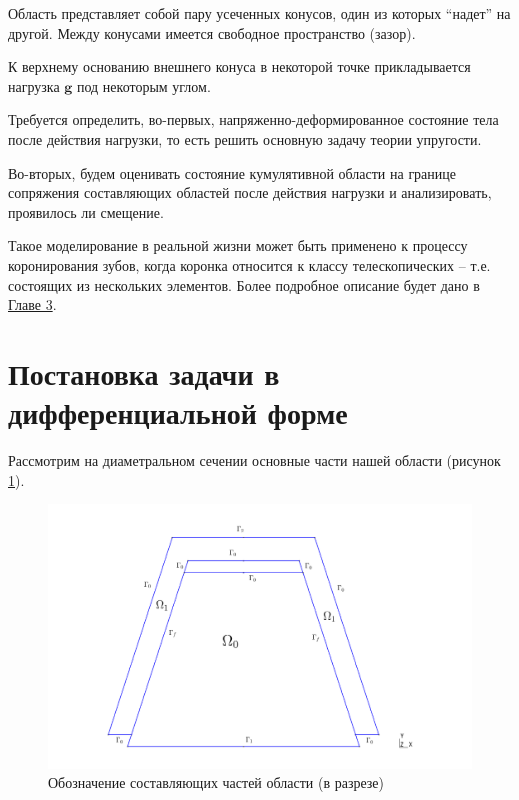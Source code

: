 \documentclass[a4paper, 14pt]{extreport}
\begin{document}
Область представляет собой пару усеченных конусов, один из которых
\enquote{надет} на другой. Между конусами имеется свободное пространство (зазор).

К верхнему основанию внешнего конуса в некоторой
точке прикладывается нагрузка $\textbf{g}$
под некоторым углом.

Требуется определить, во-первых, напряженно-деформированное состояние тела после действия нагрузки, то есть решить основную задачу теории упругости.

Во-вторых, будем оценивать состояние кумулятивной области на границе сопряжения составляющих областей после действия нагрузки и анализировать, проявилось ли смещение.

Такое моделирование в реальной жизни может быть применено к
процессу коронирования зубов, когда коронка относится к 
классу телескопических -- т.е. состоящих из нескольких 
элементов. Более подробное описание будет дано в
 \hyperref[ch:exp]{Главе 3}.



\section{Постановка задачи в дифференциальной форме}

Рассмотрим на диаметральном сечении основные части нашей области 
(рисунок \ref{fig: marked_domain}).
\begin{figure}[H]
	\center
	\includegraphics[scale=0.4]{pictures/marked_domain.png}
	\caption{Обозначение составляющих частей области (в разрезе)}
	\label{fig: marked_domain}
\end{figure}
\end{document}
